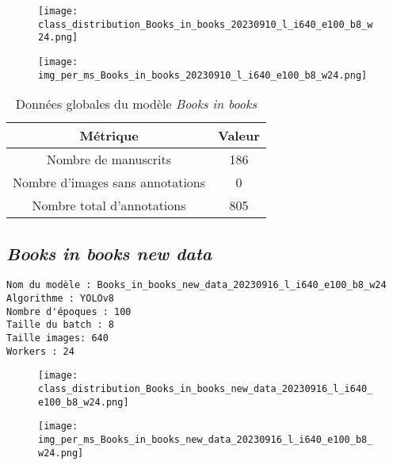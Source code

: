 \documentclass[12pt,twoside]{book}
\begin{document}
\begin{figure}[ht]
    \centering
    \begin{minipage}[b]{0.45\textwidth}
        \centering
        \texttt{[image: class\_distribution\_Books\_in\_books\_20230910\_l\_i640\_e100\_b8\_w24.png]}
    \end{minipage}
    \hfill
    \begin{minipage}[b]{0.45\textwidth}
        \centering
        \texttt{[image: img\_per\_ms\_Books\_in\_books\_20230910\_l\_i640\_e100\_b8\_w24.png]}
    \end{minipage}
\end{figure}

\begin{center}
\begin{table}[ht]
    \centering
    \caption{Données globales du modèle \textit{Books in books}}
    \begin{tabular}{|c|c|}
    \hline
    \textbf{Métrique} & \textbf{Valeur} \\
    \hline
    Nombre de manuscrits & 186 \\ 
    \hline
    Nombre d'images sans annotations & 0 \\ 
    \hline
    Nombre total d'annotations & 805 \\ 
    \hline
    \end{tabular}
\end{table}    
\end{center}

\newpage
\subsection{\textit{Books in books new data}}

\begin{verbatim}
Nom du modèle : Books_in_books_new_data_20230916_l_i640_e100_b8_w24
Algorithme : YOLOv8
Nombre d'époques : 100
Taille du batch : 8
Taille images: 640
Workers : 24
\end{verbatim}


\begin{figure}[ht]
    \centering
    \begin{minipage}[b]{0.45\textwidth}
        \centering
        \texttt{[image: class\_distribution\_Books\_in\_books\_new\_data\_20230916\_l\_i640\_e100\_b8\_w24.png]}
    \end{minipage}
    \hfill
    \begin{minipage}[b]{0.45\textwidth}
        \centering
        \texttt{[image: img\_per\_ms\_Books\_in\_books\_new\_data\_20230916\_l\_i640\_e100\_b8\_w24.png]}
    \end{minipage}
\end{figure}
\end{document}
